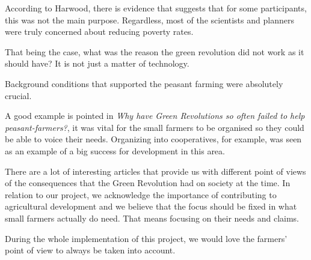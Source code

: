According to Harwood, there is evidence that suggests that for some participants, this was not the main purpose. Regardless, most of the scientists and planners were truly concerned about reducing poverty rates.

That being the case, what was the reason the green revolution did not work as it should have? It is not just a matter of technology.

Background conditions that supported the peasant farming were absolutely crucial.

A good example is pointed in \emph{Why have Green Revolutions so often failed to help peasant-farmers?}, it was vital for the small farmers to be organised so they could be able to voice their needs. Organizing into cooperatives, for example, was seen as an example of a big success for development in this area.

There are a lot of interesting articles that provide us with different point of views of the consequences that the Green Revolution had on society at the time. In relation to our project, we acknowledge the importance of contributing to agricultural development and we believe that the focus should be fixed in what small farmers actually do need. That means focusing on their needs and claims.

During the whole implementation of this project, we would love the farmers' point of view to always be taken into account.